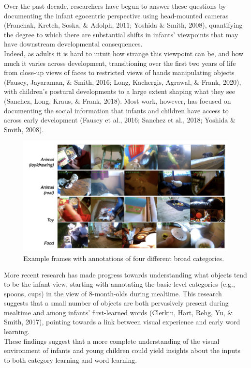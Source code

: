 \documentclass[10pt, letterpaper]{article}
\newenvironment{CodeChunk}{}{}
\begin{document}
Over the past decade, researchers have begun to answer these questions
by documenting the infant egocentric perspective using head-mounted
cameras (Franchak, Kretch, Soska, \& Adolph, 2011; Yoshida \& Smith,
2008), quantifying the degree to which there are substantial shifts in
infants' viewpoints that may have downstream developmental
consequences.\\
Indeed, as adults it is hard to intuit how strange this viewpoint can
be, and how much it varies across development, transitioning over the
first two years of life from close-up views of faces to restricted views
of hands manipulating objects (Fausey, Jayaraman, \& Smith, 2016; Long,
Kachergis, Agrawal, \& Frank, 2020), with children's postural
developments to a large extent shaping what they see (Sanchez, Long,
Kraus, \& Frank, 2018). Most work, however, has focused on documenting
the social information that infants and children have access to across
early development (Fausey et al., 2016; Sanchez et al., 2018; Yoshida \&
Smith, 2008).

\begin{CodeChunk}
\begin{figure}[h]

{\centering \includegraphics{figs/examples-1} 

}

\caption[Example frames with annotations of four different broad categories]{Example frames with annotations of four different broad categories.}\label{fig:examples}
\end{figure}
\end{CodeChunk}

More recent research has made progress towards understanding what
objects tend to be the infant view, starting with annotating the
basic-level categories (e.g., spoons, cups) in the view of 8-month-olds
during mealtime. This research suggests that a small number of objects
are both pervasively present during mealtime and among infants'
first-learned words (Clerkin, Hart, Rehg, Yu, \& Smith, 2017), pointing
towards a link between visual experience and early word learning.\\
These findings suggest that a more complete understanding of the visual
environment of infants and young children could yield insights about the
inputs to both category learning and word learning.
\end{document}
